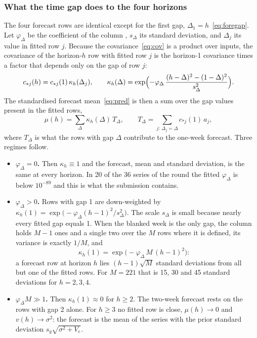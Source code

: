 \documentclass[11pt,a4paper]{article}
\newcommand{\code}[1]{\texttt{\detokenize{#1}}}
\newcommand{\ve}{V_e}
\numberwithin{equation}{section}
\begin{document}
\subsubsection{What the time gap does to the four horizons}
\label{sec:horizons}
The four forecast rows are identical except for the first gap, $\Delta_1=h$~\eqref{eq:foregap}.
Let $\varphi_\Delta$ be the coefficient of the column \code{Tdiff_1}, $s_\Delta$ its standard
deviation, and $\Delta_j$ its value in fitted row $j$. Because the covariance~\eqref{eq:cov} is a
product over inputs, the covariance of the horizon-$h$ row with fitted row $j$ is the
horizon-1 covariance times a factor that depends only on the gap of row $j$:
\begin{equation}
c_{*j}(h)=c_{*j}(1)\,\kappa_h(\Delta_j),\qquad
\kappa_h(\Delta)=\exp\Bigl(-\varphi_\Delta\,\frac{(h-\Delta)^2-(1-\Delta)^2}{s_\Delta^2}\Bigr).
\label{eq:kappa}
\end{equation}
The standardised forecast mean~\eqref{eq:pred} is then a sum over the gap values present in the
fitted rows,
\begin{equation}
\mu(h)=\sum_{\Delta}\kappa_h(\Delta)\,T_\Delta,\qquad
T_\Delta=\sum_{j:\,\Delta_j=\Delta}c_{*j}(1)\,a_j ,
\label{eq:decomp}
\end{equation}
where $T_\Delta$ is what the rows with gap $\Delta$ contribute to the one-week forecast.
Three regimes follow.
\begin{itemize}
\item \textbf{$\varphi_\Delta=0$.} Then $\kappa_h\equiv1$ and the forecast, mean and standard
deviation, is the same at every horizon. In 20 of the 36 series of the round the fitted
$\varphi_\Delta$ is below $10^{-89}$ and this is what the submission contains.
\item \textbf{$\varphi_\Delta>0$.} Rows with gap 1 are down-weighted by
$\kappa_h(1)=\exp\bigl(-\varphi_\Delta(h-1)^2/s_\Delta^2\bigr)$. The scale $s_\Delta$ is small
because nearly every fitted gap equals 1. When the blanked week is the only gap, the column holds
$M-1$ ones and a single two over the $M$ rows where it is defined, its variance is exactly $1/M$,
and
\begin{equation}
\kappa_h(1)=\exp\bigl(-\varphi_\Delta\,M\,(h-1)^2\bigr):
\end{equation}
a forecast row at horizon $h$ lies $(h-1)\sqrt{M}$ standard deviations from all but one of the
fitted rows. For $M=221$ that is 15, 30 and 45 standard deviations for $h=2,3,4$.
\item \textbf{$\varphi_\Delta M\gg1$.} Then $\kappa_h(1)\approx0$ for $h\ge2$. The two-week
forecast rests on the rows with gap 2 alone. For $h\ge3$ no fitted row is close, $\mu(h)\to0$ and
$v(h)\to\sigma^2$: the forecast is the mean of the series with the prior standard deviation
$s_y\sqrt{\sigma^2+\ve}$.
\end{itemize}
\end{document}

